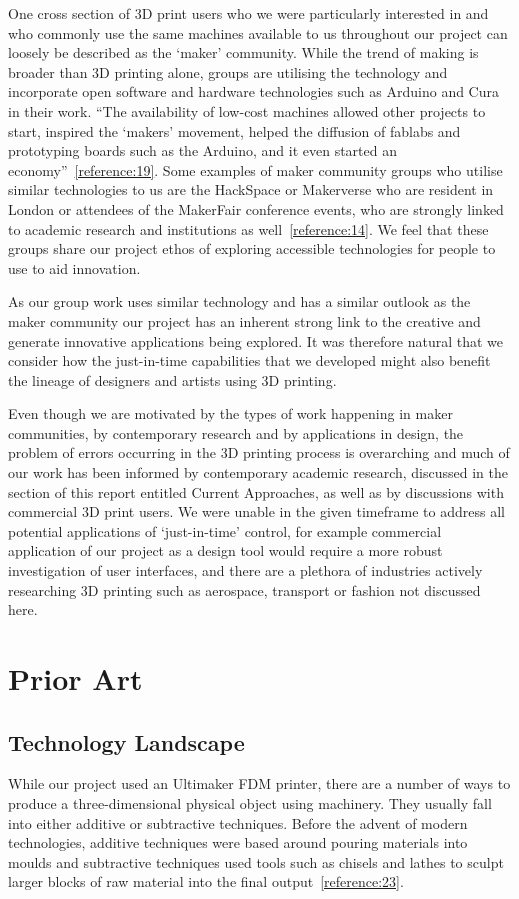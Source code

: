 \documentclass[11pt]{report} %
\begin{document}
One cross section of 3D print users who we were particularly interested in and who commonly use the same machines available to us throughout our project can loosely be described as the `maker' community. While the trend of making is broader than 3D printing alone, groups are utilising the technology and incorporate open software and hardware technologies such as Arduino and Cura in their work. ``The availability of low-cost machines allowed other projects to start, inspired the `makers' movement, helped the diffusion of fablabs and prototyping boards such as the Arduino, and it even started an economy''~\ref{reference:19}. Some examples of maker community groups who utilise similar technologies to us are the HackSpace or Makerverse who are resident in London or attendees of the MakerFair conference events, who are strongly linked to academic research and institutions as well~\ref{reference:14}. We feel that these groups share our project ethos of exploring accessible technologies for people to use to aid innovation. 

As our group work uses similar technology and has a similar outlook as the maker community our project has an inherent strong link to the creative and generate innovative applications being explored. It was therefore natural that we consider how the just-in-time capabilities that we developed might also benefit the lineage of designers and artists using 3D printing.  

Even though we are motivated by the types of work happening in maker communities, by contemporary research and by applications in design, the problem of errors occurring in the 3D printing process is overarching and much of our work has been informed by contemporary academic research, discussed in the section of this report entitled Current Approaches, as well as by discussions with commercial 3D print users. We were unable in the given timeframe to address all potential applications of `just-in-time' control, for example commercial application of our project as a design tool would require a more robust investigation of user interfaces, and there are a plethora of industries actively researching 3D printing such as aerospace, transport or fashion not discussed here.





\chapter{Prior Art}
\section{Technology Landscape}
\label{section:TechnologyLandscape}
While our project used an Ultimaker FDM printer, there are a number of ways to produce a three-dimensional physical object using machinery. They usually fall into either additive or subtractive techniques. Before the advent of modern technologies, additive techniques were based around pouring materials into moulds and subtractive techniques used tools such as chisels and lathes to sculpt larger blocks of raw material into the final output~\ref{reference:23}.
\end{document}
